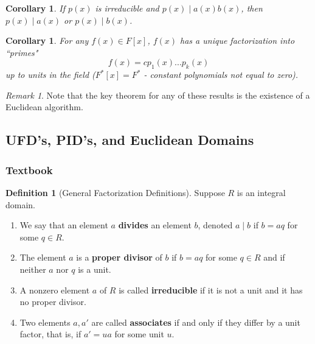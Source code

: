 \documentclass[12pt]{article}
\newtheorem{cor}[thm]{Corollary}
\theoremstyle{definition}
\newtheorem{defn}[thm]{Definition}
\theoremstyle{remark}
\newtheorem{rmk}[thm]{Remark}
\numberwithin{equation}{section}
\newcommand\B[1]{\textbf{ #1}}
\begin{document}
\vspace{15pt}

\begin{cor}
        If $p(x)$ is irreducible and $p(x)\;\vert\;a(x)b(x)$, then $p(x)\;\vert\;a(x)$ or $p(x)\;\vert\;b(x)$.
\end{cor}

\vspace{15pt}

\begin{cor}
        For any $f(x) \in F[x]$, $f(x)$ has a unique factorization into ``primes" \begin{equation}
                f(x) = cp_1(x)...p_k(x)
        \end{equation}
        up to units in the field ($F^*[x] = F^*$ - constant polynomials not equal to zero).
\end{cor}


\vspace{15pt}

\begin{rmk}
        Note that the key theorem for any of these results is the existence of a Euclidean algorithm.
\end{rmk}

\vspace{15pt}



\subsection{UFD's, PID's, and Euclidean Domains}

\subsubsection{Textbook}

\begin{defn}[General Factorization Definitions]
        Suppose $R$ is an integral domain. \begin{enumerate}
                \item We say that an element $a$ \B{divides} an element $b$, denoted $a\;\vert\;b$ if $b = aq$ for some $q \in R$. 
                \item The element $a$ is a \B{proper divisor} of $b$ if $b = aq$ for some $q \in R$ and if neither $a$ nor $q$ is a unit. 
                \item A nonzero element $a$ of $R$ is called \B{irreducible} if it is not a unit and it has no proper divisor. 
                \item Two elements $a,a'$ are called \B{associates} if and only if they differ by a unit factor, that is, if $a' = ua$ for some unit $u$.
        \end{enumerate}
\end{defn}
\end{document}
